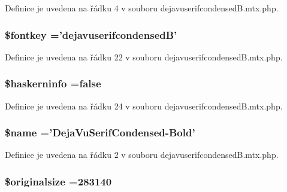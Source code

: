 Definice je uvedena na řádku 4 v souboru dejavuserifcondensed\-B.\-mtx.\-php.

\hypertarget{dejavuserifcondensed_b_8mtx_8php_a97b81cd1a67db21cdcae44cc49307a27}{
\subsubsection[{\$fontkey}]{\setlength{\rightskip}{0pt plus 5cm}\$fontkey ='dejavuserifcondensed\-B'}}\label{dejavuserifcondensed_b_8mtx_8php_a97b81cd1a67db21cdcae44cc49307a27}


Definice je uvedena na řádku 22 v souboru dejavuserifcondensed\-B.\-mtx.\-php.

\hypertarget{dejavuserifcondensed_b_8mtx_8php_ad226b2764d22aeac7b4ec5d56b83128c}{
\subsubsection[{\$haskerninfo}]{\setlength{\rightskip}{0pt plus 5cm}\$haskerninfo ={\bf false}}}\label{dejavuserifcondensed_b_8mtx_8php_ad226b2764d22aeac7b4ec5d56b83128c}


Definice je uvedena na řádku 24 v souboru dejavuserifcondensed\-B.\-mtx.\-php.

\hypertarget{dejavuserifcondensed_b_8mtx_8php_ab2fc40d43824ea3e1ce5d86dee0d763b}{
\subsubsection[{\$name}]{\setlength{\rightskip}{0pt plus 5cm}\$name ='Deja\-Vu\-Serif\-Condensed-\/Bold'}}\label{dejavuserifcondensed_b_8mtx_8php_ab2fc40d43824ea3e1ce5d86dee0d763b}


Definice je uvedena na řádku 2 v souboru dejavuserifcondensed\-B.\-mtx.\-php.

\hypertarget{dejavuserifcondensed_b_8mtx_8php_a25e8bdbc8267d6e88bc21fde74a2c0e8}{
\subsubsection[{\$originalsize}]{\setlength{\rightskip}{0pt plus 5cm}\$originalsize =283140}}\label{dejavuserifcondensed_b_8mtx_8php_a25e8bdbc8267d6e88bc21fde74a2c0e8}


